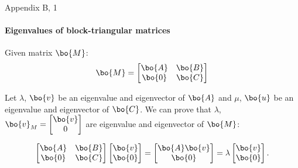 \documentclass{beamer}
\begin{document}
\begin{frame}{Appendix B, 1}
		\framesubtitle{Eigenvalues of block-triangular matrices}
	\begin{flushleft}
		
		Given matrix $\bo{M}$:
		\begin{align}
			\bo{M} = 
			\begin{bmatrix}
				\bo{A} & \bo{B} \\ \bo{0} & \bo{C}
			\end{bmatrix}
		\end{align}
		
		Let $\lambda$, $\bo{v}$ be an eigenvalue and eigenvector of $\bo{A}$ and $\mu$, $\bo{u}$ be an eigenvalue and eigenvector of $\bo{C}$. We can prove that $\lambda$, $\bo{v}_M = \begin{bmatrix}
			\bo{v} \\ 0
		\end{bmatrix}$ are eigenvalue and eigenvector of $\bo{M}$:
	
		\begin{align}
			\begin{bmatrix}
				\bo{A} & \bo{B} \\ \bo{0} & \bo{C}
			\end{bmatrix}
		\begin{bmatrix}
			\bo{v} \\ \bo{0}
		\end{bmatrix}
	=
	\begin{bmatrix}
		\bo{A}\bo{v} \\ \bo{0}
	\end{bmatrix}
	=
	\lambda
	\begin{bmatrix}
		\bo{v} \\ \bo{0}
	\end{bmatrix}.
		\end{align}
		
	\end{flushleft}
\end{frame}
\end{document}
